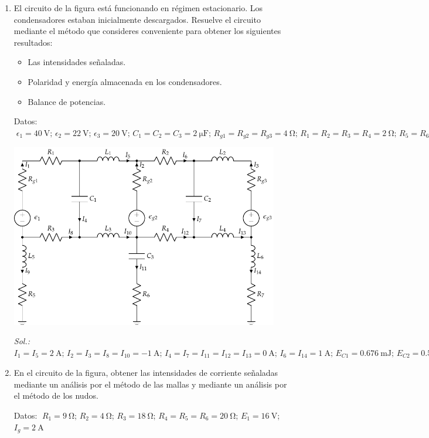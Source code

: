 \begin{enumerate}
\item El circuito de la figura está funcionando en régimen
  estacionario. Los condensadores estaban inicialmente
  descargados. Resuelve el circuito mediante el método que consideres
  conveniente para obtener los siguientes resultados:
  \begin{itemize}
  \item Las intensidades señaladas.
  \item Polaridad y energía almacenada en los condensadores.
  \item Balance de potencias.
  \end{itemize}
  Datos:
  $\; \epsilon_{1}=\qty{40}{\volt};\, \epsilon_{2}=\qty{22}{\volt};\, \epsilon_{3}=\qty{20}{\volt};\,
  C_{1}=C_{2}=C_{3}=\qty{2}{\micro\farad};\, R_{g1}=R_{g2}=R_{g3}=\qty{4}{\ohm};\,
  R_{1}=R_{2}=R_{3}=R_{4}=\qty{2}{\ohm};\, R_{5}=R_{6}=R_{7}=\qty{1}{\ohm}$
  \begin{center}
    \includegraphics[height=8cm]{../figs/mallas_condensadores_bobinas.pdf}
  \end{center}
  \emph{Sol.:\;
    $I_1=I_5=\qty{2}{\ampere};\, I_2=I_3=I_8=I_{10}=\qty{-1}{\ampere};\,
    I_4=I_7=I_{11}=I_{12}=I_{13}=\qty{0}{\ampere};\, I_6=I_{14}=\qty{1}{\ampere};\, E_{C1}=\qty{0.676}{\milli\joule};\,
    E_{C2}=\qty{0.576}{\milli\joule}; \, E_{C3}=\qty{1}{\micro\joule}; P_g = P_R$}
 

\item En el circuito de la figura, obtener las
  intensidades de corriente señaladas mediante un análisis por el
  método de las mallas y mediante un análisis por el método de los
  nudos.

  Datos: $\; R_1 = \qty{9}{\ohm}$; $R_2 = \qty{4}{\ohm}$; $R_3 = \qty{18}{\ohm}$; $R_4 = R_5 = R_6 = \qty{20}{\ohm}$; $E_1 = \qty{16}{\volt}$; $I_g = \qty{2}{\ampere}$
  

\end{enumerate}
